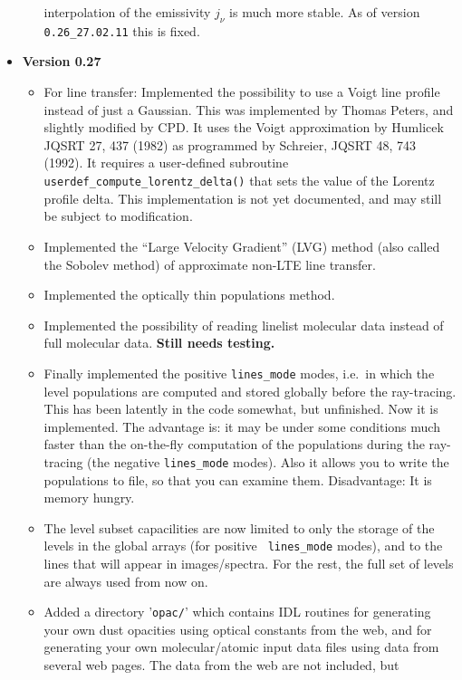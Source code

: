\documentclass{report}
\begin{document}
\begin{itemize}
\begin{itemize}
    interpolation of the emissivity $j_\nu$ is much more stable. As of
    version {\small\tt 0.26\_27.02.11} this is fixed.
  \end{itemize}
\item {\bf Version 0.27}
  \begin{itemize}
  \item For line transfer: Implemented the possibility to use a Voigt line
    profile instead of just a Gaussian. This was implemented by Thomas
    Peters, and slightly modified by CPD. It uses the Voigt approximation by
    Humlicek JQSRT 27, 437 (1982) as programmed by Schreier, JQSRT 48, 743
    (1992). It requires a user-defined subroutine {\small\tt
      userdef\_compute\_lorentz\_delta()} that sets the value of the Lorentz
    profile delta. This implementation is not yet documented, and may still
    be subject to modification. 
  \item Implemented the ``Large Velocity Gradient'' (LVG) method (also
    called the Sobolev method) of approximate non-LTE line transfer.
  \item Implemented the optically thin populations method.
  \item Implemented the possibility of reading linelist molecular data
    instead of full molecular data. {\bf Still needs testing.}
  \item Finally implemented the positive {\small\tt lines\_mode} modes,
    i.e.\ in which the level populations are computed and stored globally
    before the ray-tracing. This has been latently in the code somewhat, but
    unfinished. Now it is implemented. The advantage is: it may be under
    some conditions much faster than the on-the-fly computation of the
    populations during the ray-tracing (the negative {\small\tt lines\_mode}
    modes). Also it allows you to write the populations to file, so that you
    can examine them. Disadvantage: It is memory hungry.
  \item The level subset capacilities are now limited to only the storage of
    the levels in the global arrays (for positive {\small\tt
      lines\_mode} modes), and to the lines that will appear in
    images/spectra. For the rest, the full set of levels are always used
    from now on.
  \item Added a directory '{\small\tt opac/}' which contains IDL routines
    for generating your own dust opacities using optical constants from the
    web, and for generating your own molecular/atomic input data files using
    data from several web pages. The data from the web are not included, but

\end{itemize}
\end{itemize}
\end{document}
